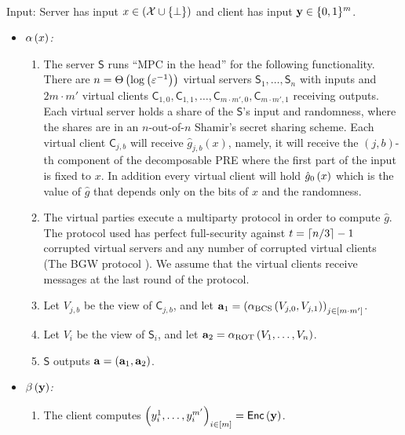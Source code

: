 \documentclass{llncs}
\newcommand{\ROT}{\operatorname{ROT}}
\newcommand{\stb}{\operatorname{BCS}}
\newcommand{\X}{\mathcal{X}}
\renewcommand{\a}{\myvec{a}}
\newcommand{\y}{\myvec{y}}
\newcommand{\srvr}{\alpha}
\newcommand{\clnt}{\beta}
\newcommand{\IKOPS}{\operatorname{IKOPS}}
\renewcommand{\Sc}{\mathsf{S}}
\newcommand{\Cc}{\mathsf{C}}
\renewcommand{\Enc}{\mathsf{Enc}}
\begin{document}
\begin{protocol}[$\Pi^+_{\IKOPS}\of{\eps}$]~

Input: Server has input $x\in(\X\cup\set{\bot})$ and client has input $\y\in\zo^m$.
    
\begin{itemize}
	\item$\srvr\of{x}$\emph{:} 
    \begin{enumerate}
    	\item The server $\Sc$ runs ``MPC in the head'' for the following functionality. There are  $n=\Theta\left ( \log\left ( \varepsilon^{-1} \right ) \right )$ virtual servers $\Sc_1,\ldots,\Sc_n$ with inputs and $2m\cdot m'$ virtual clients $\Cc_{1,0},\Cc_{1,1},\ldots,\Cc_{m\cdot m',0},\Cc_{m\cdot m',1}$ receiving outputs. Each virtual server holds a share of the $\Sc$'s input and randomness, where the shares are in an $n$-out-of-$n$ Shamir's secret sharing scheme. Each virtual client $\Cc_{j,b}$ will receive $\hat{g}_{j,b}(x)$, namely, it will receive the $(j,b)$-th component of the decomposable PRE where the first part of the input is fixed to $x$. In addition every virtual client will hold $\hat{g}_0\left ( x \right )$ which is the value of $\hat{g}$ that depends only on the bits of $x$ and the randomness.
        
        \item The virtual parties execute a multiparty protocol in order to compute $\hat{g}$. The protocol used has perfect full-security against $t=\left\lceil n/3 \right\rceil-1$ corrupted virtual servers and any number of corrupted virtual clients (\eg The BGW protocol \cite{BGW88}). We assume \wlg that the virtual clients receive messages at the last round of the protocol.
        
        \item Let $V_{j,b}$ be the view of $\Cc_{j,b}$, and let $\a_1=\vect{\srvr_{\stb}\of{V_{j,0},V_{j,1}}}_{j\in[m\cdot m']}$.
        
        \item Let $V_i$ be the view of $\Sc_i$, and let $\a_2=\srvr_{\ROT}\of{V_1,\ldots,V_n}$.
        
        \item $\Sc$ outputs $\a=(\a_1,\a_2)$.
    \end{enumerate}
    
    
    \item$\clnt\of{\y}$\emph{:}
    \begin{enumerate}
    	\item The client computes $\vect{y_i^1,\ldots,y_i^{m'}}_{i\in[m]}=\Enc\of{\y}$.
        

\end{enumerate}
\end{itemize}
\end{protocol}
\end{document}
